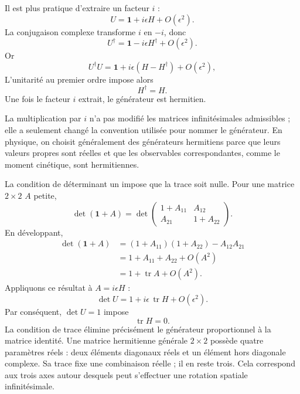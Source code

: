 Il est plus pratique d’extraire un facteur \(i\) :
\begin{equation}
U=\boldsymbol 1+i\epsilon H+O(\epsilon^2).
\label{eq:l3-small-u-herm}
\end{equation}
La conjugaison complexe transforme \(i\) en \(-i\), donc
\begin{equation}
U^\dagger=\boldsymbol 1-i\epsilon H^\dagger+O(\epsilon^2).
\end{equation}
Or
\begin{equation}
U^\dagger U
=\boldsymbol 1+i\epsilon(H-H^\dagger)+O(\epsilon^2),
\end{equation}
L’unitarité au premier ordre impose alors
\begin{equation}
H^\dagger=H.
\end{equation}
Une fois le facteur \(i\) extrait, le générateur est hermitien.

La multiplication par \(i\) n’a pas modifié les matrices infinitésimales admissibles ; elle a seulement changé la convention utilisée pour nommer le générateur. En physique, on choisit généralement des générateurs hermitiens parce que leurs valeurs propres sont réelles et que les observables correspondantes, comme le moment cinétique, sont hermitiennes.

La condition de déterminant un impose que la trace soit nulle. Pour une matrice \(2\times2\) \(A\) petite,
\begin{equation}
\det(\boldsymbol 1+A)
=
\det
\begin{pmatrix}
1+A_{11}&A_{12}\\
A_{21}&1+A_{22}
\end{pmatrix}.
\end{equation}
En développant,
\begin{align}
\det(\boldsymbol 1+A)
 &=(1+A_{11})(1+A_{22})-A_{12}A_{21}\\
 &=1+A_{11}+A_{22}+O(A^2)\\
 &=1+\operatorname{tr}A+O(A^2).
\end{align}
Appliquons ce résultat à \(A=i\epsilon H\) :
\begin{equation}
\det U=1+i\epsilon\,\operatorname{tr}H+O(\epsilon^2).
\end{equation}
Par conséquent, \(\det U=1\) impose
\begin{equation}
\operatorname{tr}H=0.
\end{equation}
La condition de trace élimine précisément le générateur proportionnel à la matrice identité. Une matrice hermitienne générale \(2\times2\) possède quatre paramètres réels : deux éléments diagonaux réels et un élément hors diagonale complexe. Sa trace fixe une combinaison réelle ; il en reste trois. Cela correspond aux trois axes autour desquels peut s’effectuer une rotation spatiale infinitésimale.

